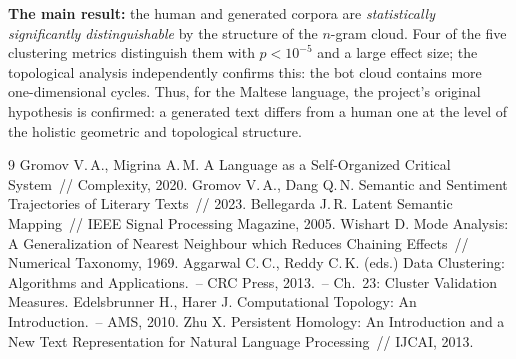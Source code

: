 \documentclass[12pt,a4paper]{article}
\begin{document}
\textbf{The main result:} the human and generated corpora are
\emph{statistically significantly distinguishable} by the structure of the
$n$-gram cloud. Four of the five clustering metrics distinguish them with
$p<10^{-5}$ and a large effect size; the topological analysis independently
confirms this: the bot cloud contains more one-dimensional cycles. Thus, for the
Maltese language, the project's original hypothesis is confirmed: a generated
text differs from a human one at the level of the holistic geometric and
topological structure.

\begin{thebibliography}{9}
 Gromov V.\,A., Migrina A.\,M.
  A Language as a Self-Organized Critical System~// Complexity, 2020.
 Gromov V.\,A., Dang Q.\,N.
  Semantic and Sentiment Trajectories of Literary Texts~// 2023.
 Bellegarda J.\,R.
  Latent Semantic Mapping~// IEEE Signal Processing Magazine, 2005.
 Wishart D.
  Mode Analysis: A Generalization of Nearest Neighbour which Reduces
  Chaining Effects~// Numerical Taxonomy, 1969.
 Aggarwal C.\,C., Reddy C.\,K. (eds.)
  Data Clustering: Algorithms and Applications.~-- CRC Press, 2013.~--
  Ch.~23: Cluster Validation Measures.
 Edelsbrunner H., Harer J.
  Computational Topology: An Introduction.~-- AMS, 2010.
 Zhu X.
  Persistent Homology: An Introduction and a New Text Representation for
  Natural Language Processing~// IJCAI, 2013.
\end{thebibliography}
\end{document}
